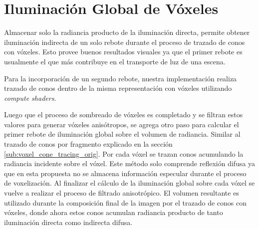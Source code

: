 \section{Iluminación Global de Vóxeles} %
\label{sec:iluminacion_global_de_voxeles}
Almacenar solo la radiancia producto de la iluminación directa, permite obtener iluminación indirecta de un solo rebote durante el proceso de trazado de conos con vóxeles. Esto provee buenos resultados visuales ya que el primer rebote es usualmente el que más contribuye en el transporte de luz de una escena.

Para la incorporación de un segundo rebote, nuestra implementación realiza trazado de conos dentro de la misma representación con vóxeles utilizando \emph{compute shaders}. 

Luego que el proceso de sombreado de vóxeles es completado y se filtran estos valores para generar vóxeles anisótropos, se agrega otro paso para calcular el primer rebote de iluminación global sobre el volumen de radiancia. Similar al trazado de conos por fragmento explicado en la sección \ref{sub:voxel_cone_tracing_orig}. Por cada vóxel se trazan conos acumulando la radiancia incidente sobre el vóxel. Este método solo comprende reflexión difusa ya que en esta propuesta no se almacena información especular durante el proceso de voxelización. Al finalizar el cálculo de la iluminación global sobre cada vóxel se vuelve a realizar el proceso de filtrado anisotrópico. El volumen resultante es utilizado durante la composición final de la imagen por el trazado de conos con vóxeles, donde ahora estos conos acumulan radiancia producto de tanto iluminación directa como indirecta difusa.
